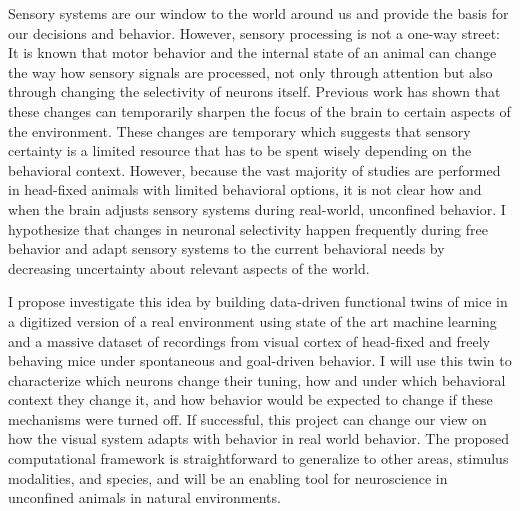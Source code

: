 Sensory systems are our window to the world around us and provide the basis for our decisions and behavior. 
However, sensory processing is not a one-way street:
It is known that motor behavior and the internal state of an animal can change the way how sensory signals are processed, not only through attention but also through changing the selectivity of  neurons itself. 
Previous work has shown that these changes can temporarily sharpen the focus of the brain to certain aspects of the environment.
These changes are temporary which suggests that sensory certainty is a limited resource that has to be spent wisely depending on the behavioral context.
However, because the vast majority of studies are performed in head-fixed animals with limited behavioral options, it is not clear how and when the brain adjusts sensory systems during real-world, unconfined behavior. 
I hypothesize that changes in neuronal selectivity happen frequently during free behavior and adapt sensory systems to the current behavioral needs by decreasing uncertainty about relevant aspects of the world.

I propose investigate this idea by building data-driven functional twins of mice in a digitized version of a real environment using state of the art machine learning and a massive dataset of recordings from visual cortex of head-fixed and freely behaving mice under spontaneous and goal-driven behavior.
I will use this twin to characterize which neurons change their tuning, how and under which behavioral context they change it, and how behavior would be expected to change if these mechanisms were turned off.
If successful, this project can change our view on how the visual system adapts with behavior in real world behavior. 
The proposed computational framework is straightforward to generalize to other areas, stimulus modalities, and species, and will be an enabling tool for neuroscience in unconfined animals in natural environments.
